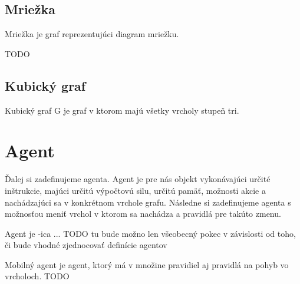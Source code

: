 \subsection{Mriežka}
Mriežka je graf reprezentujúci diagram mriežku.
\begin{defin}
TODO
\end{defin}
\subsection{Kubický graf}
\begin{defin}
Kubický graf G je graf v ktorom majú všetky vrcholy stupeň tri.
\end{defin}
\section{Agent}
Ďalej si zadefinujeme agenta. Agent je pre nás objekt vykonávajúci určité inštrukcie, majúci určitú výpočtovú silu, určitú pamäť, možnosti akcie a nachádzajúci sa v konkrétnom vrchole grafu. Následne si zadefinujeme agenta s možnosťou meniť vrchol v ktorom sa nachádza a pravidlá pre takúto zmenu.\\
\begin{defin}
Agent je -ica ... TODO tu bude možno len všeobecný pokec v závislosti od toho, či bude vhodné zjednocovať definície agentov
\end{defin}

\begin{defin}
Mobilný agent je agent, ktorý má v množine pravidiel aj pravidlá na pohyb vo vrcholoch.
TODO
\end{defin}

\fi